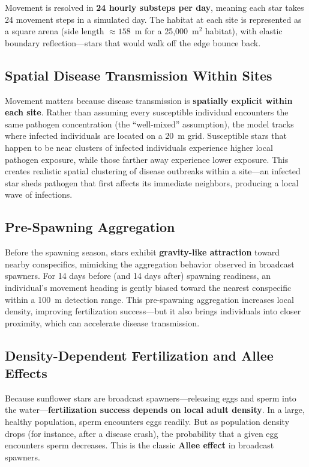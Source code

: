 \documentclass[11pt]{article}
\begin{document}
Movement is resolved in \textbf{24 hourly substeps per day}, meaning each star takes 24 movement steps in a simulated day. The habitat at each site is represented as a square arena (side length $\approx 158$~m for a 25,000~m$^2$ habitat), with elastic boundary reflection---stars that would walk off the edge bounce back.

\subsection{Spatial Disease Transmission Within Sites}

Movement matters because disease transmission is \textbf{spatially explicit within each site}. Rather than assuming every susceptible individual encounters the same pathogen concentration (the ``well-mixed'' assumption), the model tracks where infected individuals are located on a 20~m grid. Susceptible stars that happen to be near clusters of infected individuals experience higher local pathogen exposure, while those farther away experience lower exposure. This creates realistic spatial clustering of disease outbreaks within a site---an infected star sheds pathogen that first affects its immediate neighbors, producing a local wave of infections.

\subsection{Pre-Spawning Aggregation}

Before the spawning season, stars exhibit \textbf{gravity-like attraction} toward nearby conspecifics, mimicking the aggregation behavior observed in broadcast spawners. For 14 days before (and 14 days after) spawning readiness, an individual's movement heading is gently biased toward the nearest conspecific within a 100~m detection range. This pre-spawning aggregation increases local density, improving fertilization success---but it also brings individuals into closer proximity, which can accelerate disease transmission.

\subsection{Density-Dependent Fertilization and Allee Effects}

Because sunflower stars are broadcast spawners---releasing eggs and sperm into the water---\textbf{fertilization success depends on local adult density}. In a large, healthy population, sperm encounters eggs readily. But as population density drops (for instance, after a disease crash), the probability that a given egg encounters sperm decreases. This is the classic \textbf{Allee effect} in broadcast spawners.
\end{document}
